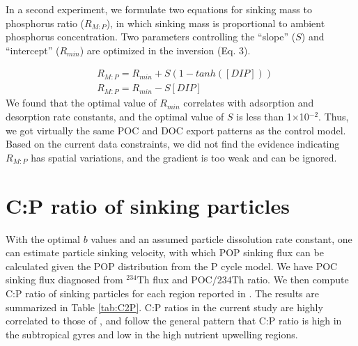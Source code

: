 In a second experiment, we formulate two equations for sinking mass to phosphorus ratio ($R_{M:P}$), in which sinking mass is proportional to ambient phosphorus concentration.
Two parameters controlling the ``slope'' ($S$) and ``intercept'' ($R_{min}$) are optimized in the inversion (Eq. 3).

\begin{equation}
\begin{split}
  &R_{M:P} = R_{min}+S(1-tanh([DIP]))\\
  &R_{M:P} = R_{min}-S[DIP]
\end{split}
\end{equation}
We found that the optimal value of $R_{min}$ correlates with adsorption and desorption rate constants, and the optimal value of $S$ is less than 1$\times$10$^{-2}$. Thus, we got virtually the same POC and DOC export patterns as the control model. Based on the current data constraints, we did not find the evidence indicating $R_{M:P}$ has spatial variations, and the gradient is too weak and can be ignored.

\section{C:P ratio of sinking particles}
With the optimal $b$ values and an assumed particle dissolution rate constant, one can estimate particle sinking velocity\citep{kriest2008}, with which POP sinking flux can be calculated given the POP distribution from the P cycle model.
We have POC sinking flux diagnosed from $^{234}$Th flux and POC/${234}$Th ratio.
We then compute C:P ratio of sinking particles for each region reported in \cite{Teng2014}.
The results are summarized in Table \ref{tab:C2P}.
C:P ratios in the current study are highly correlated to those of \cite{Teng2014}, and follow the general pattern that C:P ratio is high in the subtropical gyres and low in the high nutrient upwelling regions.

